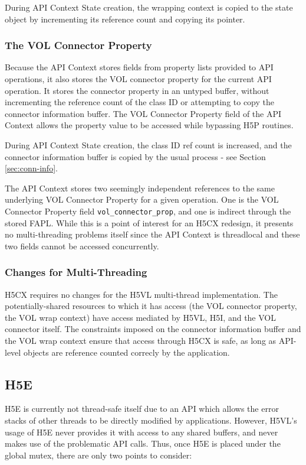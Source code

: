 \documentclass{article}
\begin{document}
During API Context State creation, the wrapping context is copied to the state object by incrementing its reference count and copying its pointer.

\subsubsection{The VOL Connector Property}

Because the API Context stores fields from property lists provided to API operations, it also stores the VOL connector property for the current API operation. It stores the connector property in an untyped buffer, without incrementing the reference count of the class ID or attempting to copy the connector information buffer. The VOL Connector Property field of the API Context allows the property value to be accessed while bypassing H5P routines.

During API Context State creation, the class ID ref count is increased, and the connector information buffer is copied by the usual process - see Section \ref{sec:conn-info}.

The API Context stores two seemingly independent references to the same underlying VOL Connector Property for a given operation. One is the VOL Connector Property field \texttt{vol\_connector\_prop}, and one is indirect through the stored FAPL. While this is a point of interest for an H5CX redesign, it presents no multi-threading problems itself since the API Context is threadlocal and these two fields cannot be accessed concurrently. 

\subsubsection{Changes for Multi-Threading}

H5CX requires no changes for the H5VL multi-thread implementation. The potentially-shared resources to which it has access (the VOL connector property, the VOL wrap context) have access mediated by H5VL, H5I, and the VOL connector itself. The constraints imposed on the connector information buffer and the VOL wrap context ensure that access through H5CX is safe, as long as API-level objects are reference counted correcly by the application.

\subsection{H5E}

H5E is currently not thread-safe itself due to an API which allows the error stacks of other threads to be directly modified by applications. However, H5VL's usage of H5E never provides it with access to any shared buffers, and never makes use of the problematic API calls. Thus, once H5E is placed under the global mutex, there are only two points to consider:
\end{document}

